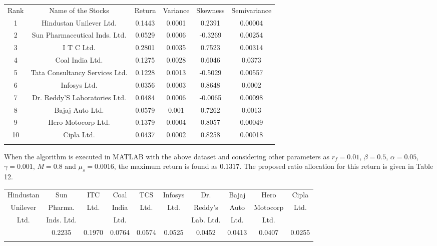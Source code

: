 \documentclass{ws-ijufks}
\begin{document}
\begin{table}[h]
	\label{tab:ER_V_Sk_S}
	{\begin{tabular}{@{}cccccc@{}} 
			\toprule
			Rank &  Name of the Stocks &  Return &  Variance &  Skewness &  Semivariance\\
			\colrule
			{1}& {Hindustan Unilever Ltd.} & {0.1443} & {0.0001} & {0.2391}  & {0.00004}\\
			{2} & {Sun Pharmaceutical Inds. Ltd.}& {0.0529} & {0.0006} & {-0.3269} & {0.00254}\\
			{3} & {I T C Ltd.} & {0.2801} & {0.0035} & {0.7523} & {0.00314}\\
			{4} & {Coal India Ltd.} & {0.1275} & {0.0028} & {0.6046} & {0.0373}\\
			{5} & {Tata Consultancy Services Ltd.} & {0.1228} & {0.0013} & {-0.5029} & {0.00557}\\
			{6} & {Infosys Ltd.} & {0.0356} & {0.0003} & {0.8648} & {0.0002}\\
			{7} & {Dr. Reddy'S Laboratories Ltd.} & {0.0484} & {0.0006} & {-0.0065} & {0.00098}\\
			{8} & {Bajaj Auto Ltd.} & {0.0579} & {0.001} & {0.7262} & {0.0013}\\	
			{9} & {Hero Motocorp Ltd.} & {0.1379} & {0.0004} & {0.8057} & {0.00049}\\
			{10} & {Cipla Ltd.} & {0.0437} & {0.0002} & {0.8258} & {0.00018}\\
			\botrule
		\end{tabular}}
	\end{table}
	
When the algorithm is executed in MATLAB with the above dataset and considering other parameters as $r_f=0.01$, $ \beta 
=0.5 $, $\alpha =0.05$, $ \gamma =0.001$, $ M=0.8 $ and $ \mu_s=0.0016 $, the maximum return is found as $0.1317$. The 
proposed ratio allocation for this return is given in Table 12.

\begin{table}[h]
	\tiny
	\label{tab:Ratio_allocation}
	{\begin{tabular}{@{}cccccccccc@{}} 
			\toprule
				Hindustan & Sun  & ITC  & Coal  & TCS  & Infosys & 
				Dr.   & Bajaj & Hero  & Cipla  \\
				
				Unilever  &  Pharma. & Ltd. & India  & Ltd. &  Ltd. & Reddy's &  Auto  & Motocorp 
			& Ltd.\\
				
				Ltd. & Inds. Ltd.& & Ltd.& &  & Lab. Ltd. & Ltd. & Ltd. &  \\
				
			\colrule
			0.2403 & 0.2235 & 0.1970 & 0.0764 & 0.0574 & 0.0525 & 0.0452 & 0.0413 & 0.0407 & 0.0255 \\
			\botrule
		\end{tabular}}
	
	\end{table}
	
\end{document}
